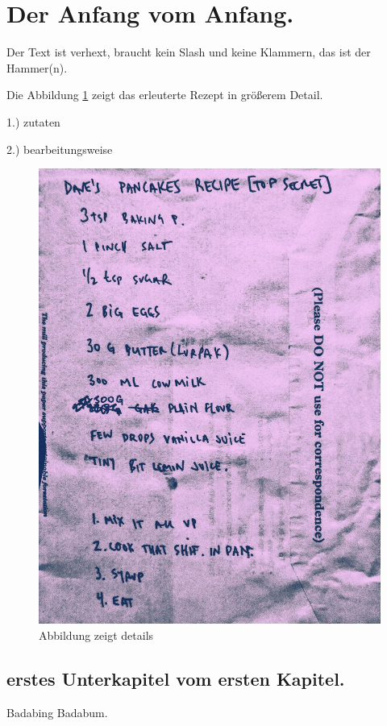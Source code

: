 \documentclass{article}
\begin{document}
    \tableofcontents

    \newpage

    \listoffigures
    
    \section{Der Anfang vom Anfang.}
    Der Text ist verhext, braucht kein Slash und keine Klammern, 
    das ist der Hammer(n).
    
        Die Abbildung \ref{fig:DAVES_PANCAKES_RECIPE} zeigt das erleuterte Rezept
        in größerem Detail. 

        1.) zutaten

        2.) bearbeitungsweise

        \begin{figure}[H]
            \centering
            \includegraphics[width=0.5\linewidth]{graphics/DAVES_PANCAKES_RECIPE.jpg}
            \caption[cooles rezept]{Abbildung zeigt details}
    
            
            \label{fig:DAVES_PANCAKES_RECIPE}
        \end{figure}
        
        \subsection {erstes Unterkapitel vom ersten Kapitel.}
        Badabing Badabum.
\end{document}
